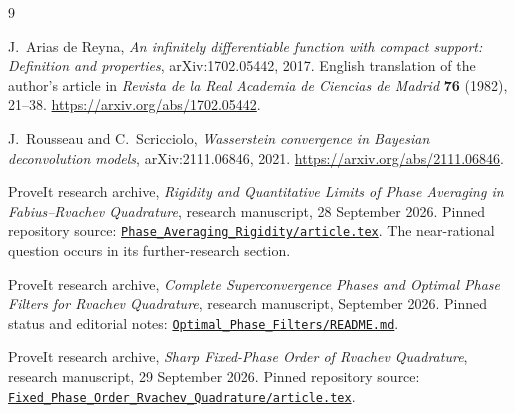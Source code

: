 \documentclass[11pt,a4paper]{article}
\numberwithin{equation}{section}
\theoremstyle{plain}
\theoremstyle{definition}
\theoremstyle{remark}
\begin{document}
\begin{thebibliography}{9}
\raggedright

J.~Arias de Reyna,
\emph{An infinitely differentiable function with compact support:
Definition and properties}, arXiv:1702.05442, 2017.
English translation of the author's article in
\emph{Revista de la Real Academia de Ciencias de Madrid} \textbf{76}
(1982), 21--38.
\url{https://arxiv.org/abs/1702.05442}.

J.~Rousseau and C.~Scricciolo,
\emph{Wasserstein convergence in Bayesian deconvolution models},
arXiv:2111.06846, 2021.
\url{https://arxiv.org/abs/2111.06846}.

ProveIt research archive,
\emph{Rigidity and Quantitative Limits of Phase Averaging in
Fabius--Rvachev Quadrature}, research manuscript, 28 September 2026.
Pinned repository source:
\href{https://github.com/VladimirReshetnikov/ProveIt/blob/cb1646dc442724f8e298cf259195b6c308367d80/Analysis/FabiusFunction/docs/semi-formalized-research-frontiers/drafts/inverse-and-sampling/comb-interpolation/Phase_Averaging_Rigidity/article.tex}
{\texttt{Phase\_Averaging\_Rigidity/article.tex}}.
The near-rational question occurs in its further-research section.

ProveIt research archive,
\emph{Complete Superconvergence Phases and Optimal Phase Filters for
Rvachev Quadrature}, research manuscript, September 2026.
Pinned status and editorial notes:
\href{https://github.com/VladimirReshetnikov/ProveIt/blob/cb1646dc442724f8e298cf259195b6c308367d80/Analysis/FabiusFunction/docs/semi-formalized-research-frontiers/drafts/inverse-and-sampling/comb-interpolation/Optimal_Phase_Filters/README.md}
{\texttt{Optimal\_Phase\_Filters/README.md}}.

ProveIt research archive,
\emph{Sharp Fixed-Phase Order of Rvachev Quadrature},
research manuscript, 29 September 2026.
Pinned repository source:
\href{https://github.com/VladimirReshetnikov/ProveIt/blob/cb1646dc442724f8e298cf259195b6c308367d80/Analysis/FabiusFunction/docs/semi-formalized-research-frontiers/drafts/inverse-and-sampling/comb-interpolation/Fixed_Phase_Order_Rvachev_Quadrature/article.tex}
{\texttt{Fixed\_Phase\_Order\_Rvachev\_Quadrature/article.tex}}.

\end{thebibliography}
\end{document}

